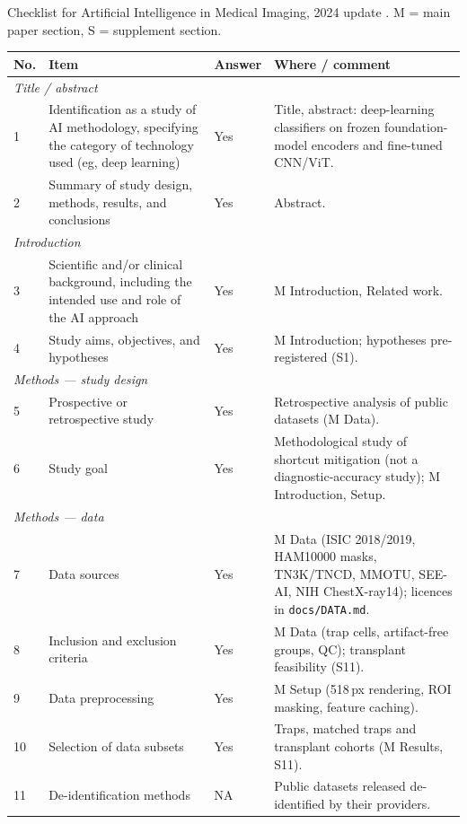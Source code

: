 Checklist for Artificial Intelligence in Medical Imaging, 2024 update \citep{tejani2024claim}. M = main paper
section, S = supplement section.
{\scriptsize
\begin{longtable}{p{0.4cm}p{6.2cm}p{0.9cm}p{7.3cm}}
\toprule
No. & Item & Answer & Where / comment \\\midrule\endhead
\multicolumn{4}{l}{\emph{Title / abstract}}\\
1 & Identification as a study of AI methodology, specifying the category of technology used (eg, deep learning) & Yes & Title, abstract: deep-learning classifiers on frozen foundation-model encoders and fine-tuned CNN/ViT. \\
2 & Summary of study design, methods, results, and conclusions & Yes & Abstract. \\
\multicolumn{4}{l}{\emph{Introduction}}\\
3 & Scientific and/or clinical background, including the intended use and role of the AI approach & Yes & M Introduction, Related work. \\
4 & Study aims, objectives, and hypotheses & Yes & M Introduction; hypotheses pre-registered (S1). \\
\multicolumn{4}{l}{\emph{Methods --- study design}}\\
5 & Prospective or retrospective study & Yes & Retrospective analysis of public datasets (M Data). \\
6 & Study goal & Yes & Methodological study of shortcut mitigation (not a diagnostic-accuracy study); M Introduction, Setup. \\
\multicolumn{4}{l}{\emph{Methods --- data}}\\
7 & Data sources & Yes & M Data (ISIC 2018/2019, HAM10000 masks, TN3K/TNCD, MMOTU, SEE-AI, NIH ChestX-ray14); licences in \texttt{docs/DATA.md}. \\
8 & Inclusion and exclusion criteria & Yes & M Data (trap cells, artifact-free groups, QC); transplant feasibility (S11). \\
9 & Data preprocessing & Yes & M Setup (518\,px rendering, ROI masking, feature caching). \\
10 & Selection of data subsets & Yes & Traps, matched traps and transplant cohorts (M Results, S11). \\
11 & De-identification methods & NA & Public datasets released de-identified by their providers. \\

\end{longtable}}
